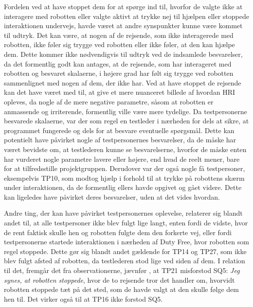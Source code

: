 Fordelen ved at have stoppet dem for at spørge ind til, hvorfor de valgte ikke at interagere med robotten eller valgte aktivt at trykke nej til hjælpen eller stoppede interaktionen undervejs, havde været at andre synspunkter kunne være kommet til udtryk. Det kan være, at nogen af de rejsende, som ikke interagerede med robotten, ikke føler sig trygge ved robotten eller ikke føler, at den kan hjælpe dem. Dette kommer ikke nødvendigvis til udtryk ved de indsamlede besvarelser, da det formentlig godt kan antages, at de rejsende, som har interageret med robotten og besvaret skalaerne, i højere grad har følt sig trygge ved robotten sammenlignet med nogen af dem, der ikke har. Ved at have stoppet de rejsende kan det have været med til, at give et mere nuanceret billede af hvordan HRI opleves, da nogle af de mere negative parametre, såsom at robotten er anmassende og irriterende, formentlig ville være mere tydelige. \blankline
%
Da testpersonerne besvarede skalaerne, var der som regel en testleder i nærheden for dels at sikre, at programmet fungerede og dels for at besvare eventuelle spørgsmål. Dette kan potentielt have påvirket nogle af testpersonernes besvarelser, da de måske har været bevidste om, at testlederen kunne se besvarelserne, hvorfor de måske enten har vurderet nogle parametre lavere eller højere, end hvad de reelt mener, bare for at tilfredsstille projektgruppen. Derudover var der også nogle få testpersoner, eksempelvis TP10, som modtog hjælp i forhold til at trykke på robottens skærm under interaktionen, da de formentlig ellers havde opgivet og gået videre. Dette kan ligeledes have påvirket deres besvarelser, uden at det vides hvordan. 

Andre ting, der kan have påvirket testpersonernes oplevelse, relaterer sig blandt andet til, at alle testpersoner ikke blev fulgt lige langt, enten fordi de vidste, hvor de rent faktisk skulle hen og robotten fulgte dem den forkerte vej, eller fordi testpersonerne startede interaktionen i nærheden af Duty Free, hvor robotten som regel stoppede. Dette gør sig blandt andet gældende for TP14 og TP27, som ikke blev fulgt afsted af robotten, da testlederen stod lige ved siden af dem. I relation til det, fremgår det fra observationerne, jævnfør , at TP21 misforstod SQ5: \textit{Jeg synes, at robotten stoppede}, hvor de to rejsende tror det handler om, hvorvidt robotten stoppede tæt på det sted, som de havde valgt at den skulle følge dem hen til. Det virker også til at TP16 ikke forstod SQ5. 

